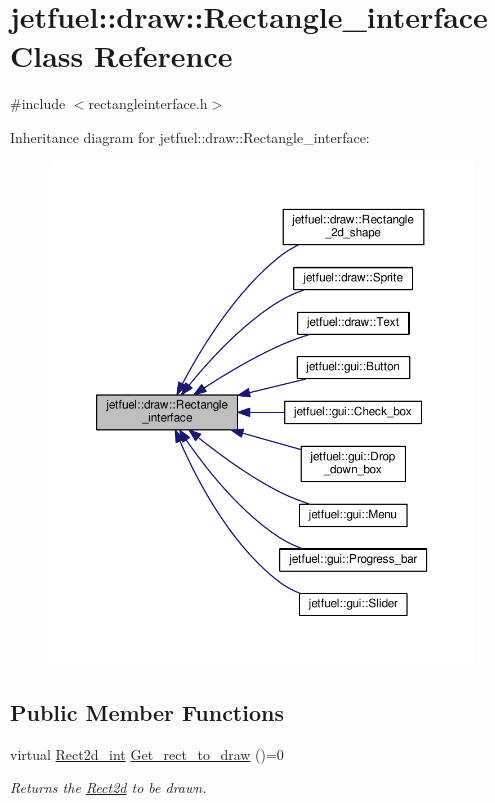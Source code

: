 \hypertarget{classjetfuel_1_1draw_1_1Rectangle__interface}{}\section{jetfuel\+:\+:draw\+:\+:Rectangle\+\_\+interface Class Reference}
\label{classjetfuel_1_1draw_1_1Rectangle__interface}


{\ttfamily \#include $<$rectangleinterface.\+h$>$}



Inheritance diagram for jetfuel\+:\+:draw\+:\+:Rectangle\+\_\+interface\+:\nopagebreak
\begin{figure}[H]
\begin{center}
\leavevmode
\includegraphics[width=350pt]{classjetfuel_1_1draw_1_1Rectangle__interface__inherit__graph}
\end{center}
\end{figure}
\subsection*{Public Member Functions}
\begin{DoxyCompactItemize}
\item 
virtual \hyperlink{classjetfuel_1_1draw_1_1Rect2d}{Rect2d\+\_\+int} \hyperlink{classjetfuel_1_1draw_1_1Rectangle__interface_a03fd3b6842ab7b3065379caec407296f}{Get\+\_\+rect\+\_\+to\+\_\+draw} ()=0
\begin{DoxyCompactList}\small\item\em Returns the \hyperlink{classjetfuel_1_1draw_1_1Rect2d}{Rect2d} to be drawn. \end{DoxyCompactList}\end{DoxyCompactItemize}


